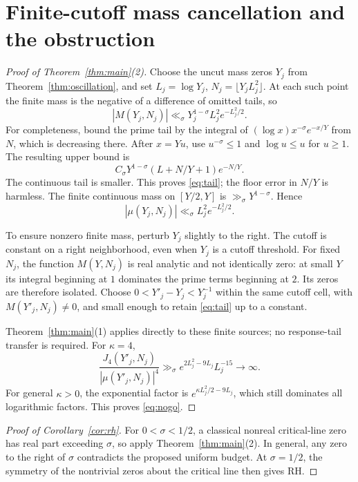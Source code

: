 \documentclass[11pt,a4paper]{article}
\theoremstyle{definition}
\theoremstyle{remark}
\begin{document}
\section{Finite-cutoff mass cancellation and the obstruction}

\begin{proof}[Proof of Theorem~\ref{thm:main}(2)]
Choose the uncut mass zeros \(Y_j\) from
Theorem~\ref{thm:oscillation}, and set \(L_j=\log Y_j\),
\(N_j=\lfloor Y_jL_j^2\rfloor\).
At each such point the finite mass is the negative of a difference
of omitted tails, so
\begin{equation}
 |M(Y_j,N_j)|\ll_\sigma
 Y_j^{1-\sigma}L_j^2e^{-L_j^2/2}.
 \label{eq:tail}
\end{equation}
For completeness, bound the prime tail by the integral of
\((\log x)x^{-\sigma}e^{-x/Y}\) from \(N\), which is decreasing
there. After \(x=Yu\), use \(u^{-\sigma}\le1\) and \(\log u\le u\)
for \(u\ge1\). The resulting upper bound is
\[
 C_\sigma Y^{1-\sigma}(L+N/Y+1)e^{-N/Y}.
\]
The continuous tail is smaller. This proves \eqref{eq:tail};
the floor error in \(N/Y\) is harmless.
The finite continuous mass on \([Y/2,Y]\) is
\(\gg_\sigma Y^{1-\sigma}\). Hence
\[
 |\mu(Y_j,N_j)|\ll_\sigma L_j^2e^{-L_j^2/2}.
\]

To ensure nonzero finite mass, perturb \(Y_j\) slightly to the right.
The cutoff is constant on a right neighborhood, even when \(Y_j\)
is a cutoff threshold. For fixed \(N_j\), the function
\(M(Y,N_j)\) is real analytic and not identically zero: at small
\(Y\) its integral beginning at \(1\) dominates the prime terms
beginning at \(2\). Its zeros are therefore isolated.
Choose \(0<Y'_j-Y_j<Y_j^{-1}\) within the same cutoff cell, with
\(M(Y'_j,N_j)\ne0\), and small enough to retain
\eqref{eq:tail} up to a constant.

Theorem~\ref{thm:main}(1) applies directly to these finite sources;
no response-tail transfer is required. For \(\kappa=4\),
\[
 \frac{J_4(Y'_j,N_j)}{|\mu(Y'_j,N_j)|^4}
 \gg_\sigma e^{2L_j^2-9L_j}L_j^{-15}\longrightarrow\infty.
\]
For general \(\kappa>0\), the exponential factor is
\(e^{\kappa L_j^2/2-9L_j}\), which still dominates all logarithmic
factors. This proves \eqref{eq:nogo}.
\end{proof}

\begin{proof}[Proof of Corollary~\ref{cor:rh}]
For \(0<\sigma<1/2\), a classical nonreal critical-line zero has
real part exceeding \(\sigma\), so apply Theorem~\ref{thm:main}(2).
In general, any zero to the right of \(\sigma\) contradicts the
proposed uniform budget. At \(\sigma=1/2\), the symmetry of the
nontrivial zeros about the critical line then gives RH.
\end{proof}
\end{document}
